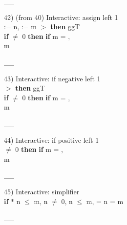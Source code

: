 \documentclass[a4paper]{article}
\begin{document}
\vspace{-1.5ex}\_\hrulefill \_

42)  (from 40) Interactive: assign left  1\\
\Do {} := n,  := m\Dc
{}  $>$  {\bf then} ggT \\
 \tabf \tabudo{}\tabudc{} {\bf if}  $\neq$ 0 {\bf then} {\bf if}  %
m = , \\
 \tabf m %

\vspace{-1.5ex}\_\hrulefill \_

43) Interactive: if negative left  1\\
  $>$  {\bf then} ggT \\
 \tabf {} {\bf if}  $\neq$ 0 {\bf then} {\bf if}  %
m = , \\
 \tabf m %

\vspace{-1.5ex}\_\hrulefill \_

44) Interactive: if positive left  1\\
  $\neq$ 0 {\bf then} {\bf if}  %
m = , \\
 \tabf m %

\vspace{-1.5ex}\_\hrulefill \_

45) Interactive: simplifier \\
\Do 
{\bf if}  %
  $*$ n $\le$ m, n $\neq$ 0, n $\le$ m,  = n \And {} = m \Fol

\vspace{-1.5ex}\_\hrulefill \_
\end{document}
